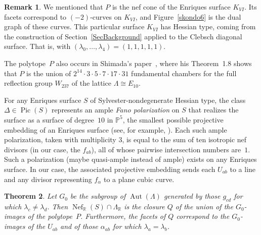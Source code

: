 \documentclass[11pt]{article}
\newtheorem{theo}{Theorem}[section]
\theoremstyle{definition}
\newtheorem{rema}[theo]{Remark}
\numberwithin{equation}{section}
\numberwithin{figure}{section}
\numberwithin{table}{section}
\newcommand*\R{\mathbb{R}}
\let\iso\cong
\newcommand{\bbP}{{\mathbb{P}}}
\DeclareMathOperator{\Aut}{Aut}
\DeclareMathOperator{\Nef}{Nef}
\DeclareMathOperator{\Pic}{Pic}
\begin{document}
\begin{rema}\label{RkPolytopeRemarks}
We mentioned that $P$ is the nef cone of the Enriques surface $K_{VI}$. Its facets correspond to $(-2)$-curves on $K_{VI}$, and Figure~\ref{skondo6} is the dual graph of these curves. This particular surface $K_{VI}$ has Hessian type, coming from the construction of Section~\ref{SecBackground} applied to the Clebsch diagonal surface. That is, with $(\lambda_0,\ldots,\lambda_4) = (1,1,1,1,1)$.

The polytope~$P$ also occurs in Shimada's paper~\cite{Shimada}, where his Theorem~1.8 shows that $P$ is the union of $2^{14}\cdot 3\cdot 5\cdot 7\cdot 17\cdot 31$ fundamental chambers for the full reflection group $W_{237}$ of the lattice $\Lambda\iso E_{10}$.

For any Enriques surface $S$ of Sylvester-nondegenerate Hessian type, the class $\Delta\in\Pic(S)$ represents an ample \emph{Fano polarization} on $S$ that realizes the surface as a surface of degree~$10$ in $\bbP^5$, the smallest possible projective embedding of an Enriques surface (see, for example, \cite[p.~14]{DolgachevBrief}). Each such ample polarization, taken with multiplicity $3$, is equal to the sum of ten isotropic nef divisors (in our case, the $f_{ab}$), all of whose pairwise intersection numbers are~$1$. Such a  polarization (maybe quasi-ample instead of ample) exists on any Enriques surface. In our case, the associated projective embedding sends each $U_{ab}$ to a line and any divisor representing $f_{\alpha}$ to a plane cubic curve.
\end{rema}

\begin{theo}\label{Thmnefcone}
Let $G_0$ be the subgroup of $\Aut(\Lambda)$ generated by those $g_{cd}$ for which $\lambda_c\neq\lambda_d$. Then $\Nef_\R(S)\cap\Lambda_\R$ is the closure $Q$ of the union of the $G_0$-images of the polytope~$P$. Furthermore, the facets of $Q$ correspond to the $G_0$-images of the $U_{ab}$ and of those $\alpha_{ab}$ for which $\lambda_a=\lambda_b$.
\end{theo}
\end{document}
